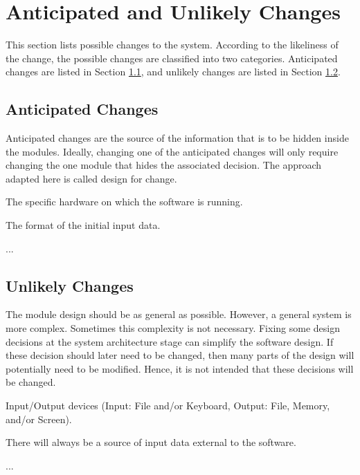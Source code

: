 \documentclass[12pt, titlepage]{article}
\newcounter{acnum}
\newcommand{\actheacnum}{AC\theacnum}
\newcounter{ucnum}
\newcommand{\uctheucnum}{UC\theucnum}
\begin{document}
\section{Anticipated and Unlikely Changes} \label{SecChange}

This section lists possible changes to the system. According to the likeliness
of the change, the possible changes are classified into two
categories. Anticipated changes are listed in Section \ref{SecAchange}, and
unlikely changes are listed in Section \ref{SecUchange}.

\subsection{Anticipated Changes} \label{SecAchange}

Anticipated changes are the source of the information that is to be hidden
inside the modules. Ideally, changing one of the anticipated changes will only
require changing the one module that hides the associated decision. The approach
adapted here is called design for
change.

\begin{description}
\item[ \actheacnum \label{acHardware}:] The specific
  hardware on which the software is running.
\item[ \actheacnum \label{acInput}:] The format of the
  initial input data.
\item ...
\end{description}

\subsection{Unlikely Changes} \label{SecUchange}

The module design should be as general as possible. However, a general system is
more complex. Sometimes this complexity is not necessary. Fixing some design
decisions at the system architecture stage can simplify the software design. If
these decision should later need to be changed, then many parts of the design
will potentially need to be modified. Hence, it is not intended that these
decisions will be changed.

\begin{description}
\item[ \uctheucnum \label{ucIO}:] Input/Output devices
  (Input: File and/or Keyboard, Output: File, Memory, and/or Screen).
\item[ \uctheucnum \label{ucInput}:] There will always be
  a source of input data external to the software.
\item ...
\end{description}
\end{document}
